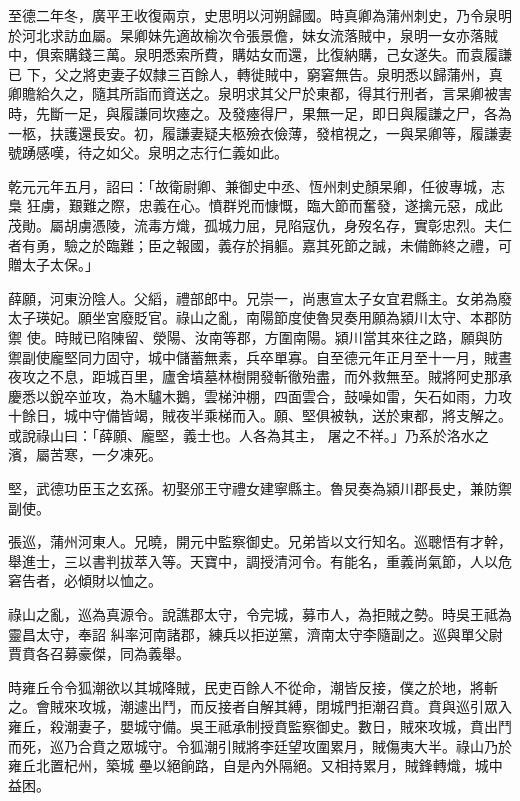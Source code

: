 \begin{pinyinscope}
 至德二年冬，廣平王收復兩京，史思明以河朔歸國。時真卿為蒲州刺史，乃令泉明於河北求訪血屬。杲卿妹先適故榆次令張景儋，妹女流落賊中，泉明一女亦落賊中，俱索購錢三萬。泉明悉索所費，購姑女而還，比復納購，己女遂失。而袁履謙已
 下，父之將吏妻子奴隸三百餘人，轉徙賊中，窮窘無告。泉明悉以歸蒲州，真卿贍給久之，隨其所詣而資送之。泉明求其父尸於東都，得其行刑者，言杲卿被害時，先斷一足，與履謙同坎瘞之。及發瘞得尸，果無一足，即日與履謙之尸，各為一柩，扶護還長安。初，履謙妻疑夫柩殮衣儉薄，發棺視之，一與杲卿等，履謙妻號踴感嘆，待之如父。泉明之志行仁義如此。



 乾元元年五月，詔曰：「故衛尉卿、兼御史中丞、恆州刺史顏杲卿，任彼專城，志梟
 狂虜，艱難之際，忠義在心。憤群兇而慷慨，臨大節而奮發，遂擒元惡，成此茂勛。屬胡虜憑陵，流毒方熾，孤城力屈，見陷寇仇，身歿名存，實彰忠烈。夫仁者有勇，驗之於臨難；臣之報國，義存於捐軀。嘉其死節之誠，未備飾終之禮，可贈太子太保。」



 薛願，河東汾陰人。父縚，禮部郎中。兄崇一，尚惠宣太子女宜君縣主。女弟為廢太子瑛妃。願坐宮廢貶官。祿山之亂，南陽節度使魯炅奏用願為潁川太守、本郡防禦
 使。時賊已陷陳留、滎陽、汝南等郡，方圍南陽。潁川當其來往之路，願與防禦副使龐堅同力固守，城中儲蓄無素，兵卒單寡。自至德元年正月至十一月，賊晝夜攻之不息，距城百里，廬舍墳墓林樹開發斬徹殆盡，而外救無至。賊將阿史那承慶悉以銳卒並攻，為木驢木鵝，雲梯沖棚，四面雲合，鼓噪如雷，矢石如雨，力攻十餘日，城中守備皆竭，賊夜半乘梯而入。願、堅俱被執，送於東都，將支解之。或說祿山曰：「薛願、龐堅，義士也。人各為其主，
 屠之不祥。」乃系於洛水之濱，屬苦寒，一夕凍死。



 堅，武德功臣玉之玄孫。初娶邠王守禮女建寧縣主。魯炅奏為潁川郡長史，兼防禦副使。



 張巡，蒲州河東人。兄曉，開元中監察御史。兄弟皆以文行知名。巡聰悟有才幹，舉進士，三以書判拔萃入等。天寶中，調授清河令。有能名，重義尚氣節，人以危窘告者，必傾財以恤之。



 祿山之亂，巡為真源令。說譙郡太守，令完城，募市人，為拒賊之勢。時吳王祗為靈昌太守，奉詔
 糾率河南諸郡，練兵以拒逆黨，濟南太守李隨副之。巡與單父尉賈賁各召募豪傑，同為義舉。



 時雍丘令令狐潮欲以其城降賊，民吏百餘人不從命，潮皆反接，僕之於地，將斬之。會賊來攻城，潮遽出鬥，而反接者自解其縛，閉城門拒潮召賁。賁與巡引眾入雍丘，殺潮妻子，嬰城守備。吳王祗承制授賁監察御史。數日，賊來攻城，賁出鬥而死，巡乃合賁之眾城守。令狐潮引賊將李廷望攻圍累月，賊傷夷大半。祿山乃於雍丘北置杞州，築城
 壘以絕餉路，自是內外隔絕。又相持累月，賊鋒轉熾，城中益困。




\end{pinyinscope}
